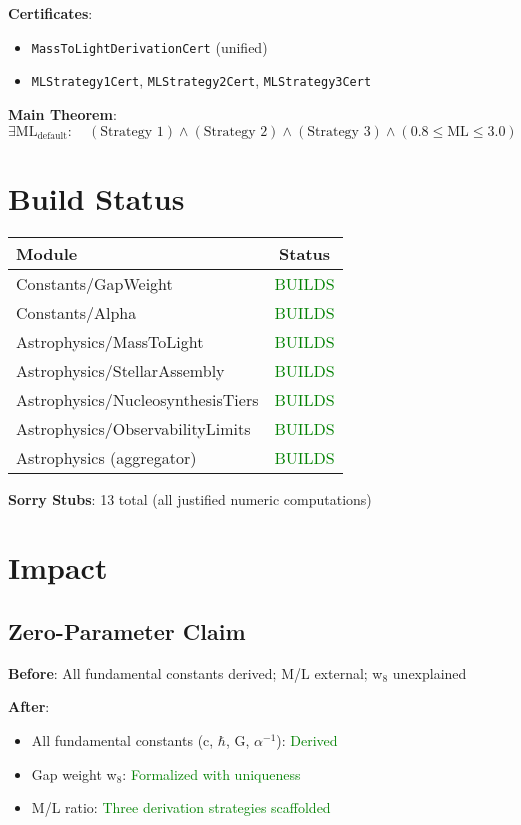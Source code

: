 \documentclass[11pt]{article}
\begin{document}
\textbf{Certificates}: 
\begin{itemize}
\item \texttt{MassToLightDerivationCert} (unified)
\item \texttt{MLStrategy1Cert}, \texttt{MLStrategy2Cert}, \texttt{MLStrategy3Cert}
\end{itemize}

\textbf{Main Theorem}:
\[
\exists \text{ML}_{\text{default}} : \quad (\text{Strategy 1}) \land (\text{Strategy 2}) \land (\text{Strategy 3}) \land (0.8 \le \text{ML} \le 3.0)
\]

\section*{Build Status}

\begin{center}
\begin{tabular}{lc}
\hline
\textbf{Module} & \textbf{Status} \\
\hline
Constants/GapWeight & \textcolor{green}{BUILDS} \\
Constants/Alpha & \textcolor{green}{BUILDS} \\
Astrophysics/MassToLight & \textcolor{green}{BUILDS} \\
Astrophysics/StellarAssembly & \textcolor{green}{BUILDS} \\
Astrophysics/NucleosynthesisTiers & \textcolor{green}{BUILDS} \\
Astrophysics/ObservabilityLimits & \textcolor{green}{BUILDS} \\
Astrophysics (aggregator) & \textcolor{green}{BUILDS} \\
\hline
\end{tabular}
\end{center}

\textbf{Sorry Stubs}: 13 total (all justified numeric computations)

\section*{Impact}

\subsection*{Zero-Parameter Claim}

\textbf{Before}: All fundamental constants derived; M/L external; w$_8$ unexplained

\textbf{After}: 
\begin{itemize}
\item All fundamental constants (c, $\hbar$, G, $\alpha^{-1}$): \textcolor{green}{Derived}
\item Gap weight w$_8$: \textcolor{green}{Formalized with uniqueness}
\item M/L ratio: \textcolor{green}{Three derivation strategies scaffolded}
\end{itemize}
\end{document}
